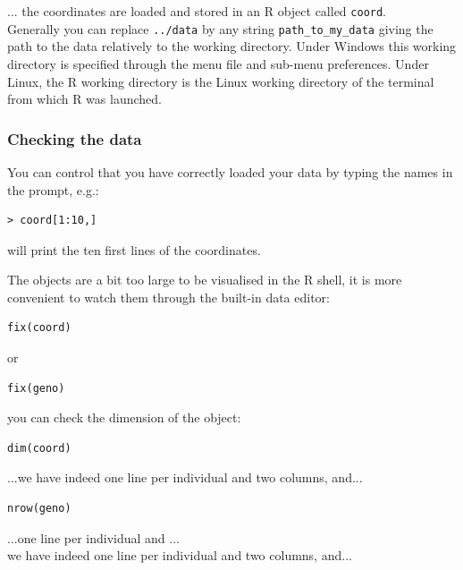 \documentclass[a4paper,10pt]{article}
\begin{document}
... the coordinates are loaded and stored in an R object called \texttt{coord}.\\


Generally you can replace {\tt ../data} by any string {\tt path\_to\_my\_data}  
giving the path  to the data relatively to the working directory. 
Under Windows this working directory is  specified through the menu file and sub-menu preferences. 
Under  Linux, the R working directory is the Linux working directory of the terminal  from which R was launched. 


\subsubsection{Checking the data}
You can control that you have correctly loaded your data by typing the names in the prompt, e.g.:

\begin{verbatim}
> coord[1:10,]
\end{verbatim}



will print the ten first lines of the coordinates.

The objects are a bit too large to be visualised in the R shell, it is more convenient to watch them through the built-in data editor:

\begin{verbatim}
fix(coord)
\end{verbatim}



or 

\begin{verbatim}
fix(geno)
\end{verbatim}



you can check the dimension of the object:

\begin{verbatim}
dim(coord)
\end{verbatim}



...we have indeed one line per individual and two columns, and...

\begin{verbatim}
nrow(geno)
\end{verbatim}



...one line per individual and ...\\

we have indeed one line per individual and two columns, and...
\end{document}

